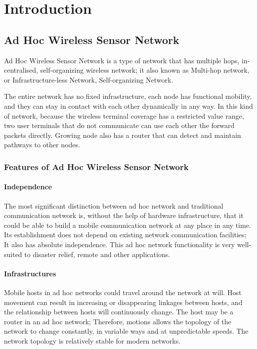 \chapter{Introduction}
\label{chap:introduction}


\section{Ad Hoc Wireless Sensor Network}

Ad Hoc Wireless Sensor Network is a type of network that has multiple hops, in-centralised, self-organizing wireless network; it also known as Multi-hop network, or Infrastructure-less Network, Self-organizing Network.

The entire network has no fixed infrastructure, each node has functional mobility, and they can stay in contact with each other dynamically in any way. In this kind of network, because the wireless terminal coverage has a restricted value range, two user terminals that do not communicate can use each other the forward packets directly. Growing node also has a router that can detect and maintain pathways to other nodes.

\subsection{Features of Ad Hoc Wireless Sensor Network}

\subsubsection{Independence}
The most significant distinction between ad hoc network and traditional communication network is, without the help of hardware infrastructure, that it could be able to build a mobile communication network at any place in any time. 
Its establishment does not depend on existing network communication facilities; It also has absolute independence.
This ad hoc network functionality is very well-suited to disaster relief, remote and other applications.

\subsubsection{Infrastructures}
Mobile hosts in ad hoc networks could travel around the network at will. Host movement can result in increasing or disappearing linkages between hosts, and the relationship between hosts will continuously change. The host may be a router in an ad hoc network; Therefore, motions allows the topology of the network to change constantly, in variable ways and at unpredictable speeds. The network topology is relatively stable for modern networks.


